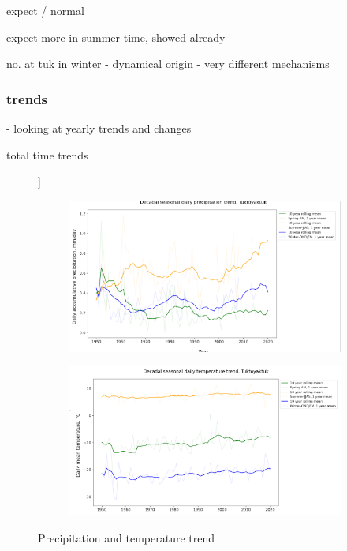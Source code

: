 \documentclass[draft]{agujournal2019}
\begin{document}
expect / normal 

expect more in summer time, showed already 



no. at tuk in winter - dynamical origin - very different mechanisms 


\subsubsection{trends}
- looking at yearly trends and changes


total time trends

\begin{figure}[h!tbp]]
\centering
\begin{subfigure}[b]{0.55\textwidth}
   \includegraphics[width=1\linewidth]{figures/decadal_seasonal_daily_precip_trend_tuk.png}
   \caption{}
   \label{fig:Ng1} 
\end{subfigure}

\begin{subfigure}[b]{0.55\textwidth}
   \includegraphics[width=1\linewidth]{figures/decadal_seasonal_temperature_tuk.png}
   \caption{}
   \label{fig:Ng2}
\end{subfigure}

\caption{Precipitation and temperature trend }
\end{figure}
\end{document}
